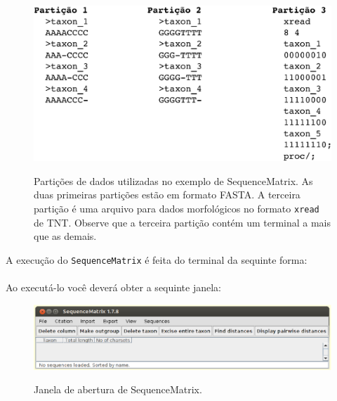 \begin{refsection}
  \begin{figure}[H]
      {\includegraphics[scale=1.0]{figures/tut7/partitions.eps}}
	{\caption[Três exemplos de partições de dados]{Partições de dados utilizadas no exemplo de SequenceMatrix. As duas primeiras partições estão em formato FASTA. A terceira partição é uma arquivo para dados morfológicos no formato \texttt{xread} de TNT. Observe que a terceira partição contém um terminal a mais que as demais.}\label{tut7:fig:partitions}}
  \end{figure}


A execução do \texttt{SequenceMatrix} é feita do terminal da sequinte forma:\\

\\

Ao executá-lo você deverá obter a sequinte janela:\\

  \begin{figure}[H]
      {\includegraphics[scale=0.5]{figures/tut7/seqmatrix_1.eps}}
	{\caption[Janela de abertura de SequenceMatrix]{Janela de abertura de SequenceMatrix.}\label{tut7:fig:seqmatrix_1}}
  \end{figure}


\end{refsection}
